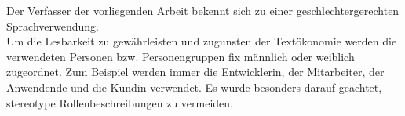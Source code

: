 Der Verfasser der vorliegenden Arbeit bekennt sich zu einer geschlechtergerechten Sprachverwendung.\\

Um die Lesbarkeit zu gewährleisten und zugunsten der Textökonomie werden die verwendeten Personen bzw. Personengruppen fix männlich oder weiblich zugeordnet. Zum Beispiel werden immer die Entwicklerin, der Mitarbeiter, der Anwendende und die Kundin verwendet. Es wurde besonders darauf geachtet, stereotype Rollenbeschreibungen zu vermeiden.
